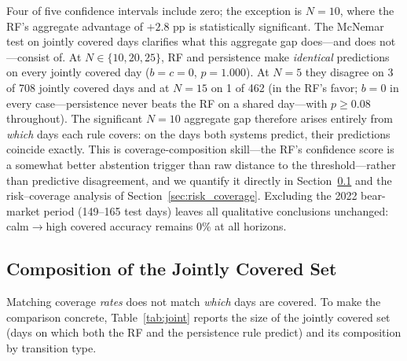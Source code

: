 \documentclass[12pt]{article}
\begin{document}
Four of five confidence intervals include zero; the exception is $N = 10$, where the RF's
aggregate advantage of $+2.8$ pp is statistically significant. The McNemar test on jointly
covered days clarifies what this aggregate gap does---and does not---consist of. At
$N \in \{10, 20, 25\}$, RF and persistence make \emph{identical} predictions on every jointly
covered day ($b = c = 0$, $p = 1.000$). At $N = 5$ they disagree on 3 of 708 jointly covered
days and at $N = 15$ on 1 of 462 (in the RF's favor; $b = 0$ in every case---persistence never
beats the RF on a shared day---with $p \geq 0.08$ throughout). The significant $N = 10$
aggregate gap therefore arises entirely from \emph{which} days each rule covers: on the days
both systems predict, their predictions coincide exactly. This is coverage-composition
skill---the RF's confidence score is a somewhat better abstention trigger than raw distance to
the threshold---rather than predictive disagreement, and we quantify it directly in
Section~\ref{sec:joint_coverage} and the risk--coverage analysis of
Section~\ref{sec:risk_coverage}. Excluding the 2022 bear-market period (149--165 test days)
leaves all qualitative conclusions unchanged: calm$\to$high covered accuracy remains 0\% at all
horizons.

\subsection{Composition of the Jointly Covered Set}
\label{sec:joint_coverage}

Matching coverage \emph{rates} does not match \emph{which} days are covered. To make the
comparison concrete, Table~\ref{tab:joint} reports the size of the jointly covered set (days on
which both the RF and the persistence rule predict) and its composition by transition type.

\begin{table}[H]
\centering
\caption{Size and transition-type composition of the jointly covered set
(RF $\cap$ persistence, $\tau = 0.25$). Percentages in the four rightmost columns are shares
of the joint set.}
\label{tab:joint}
\end{table}
\end{document}

